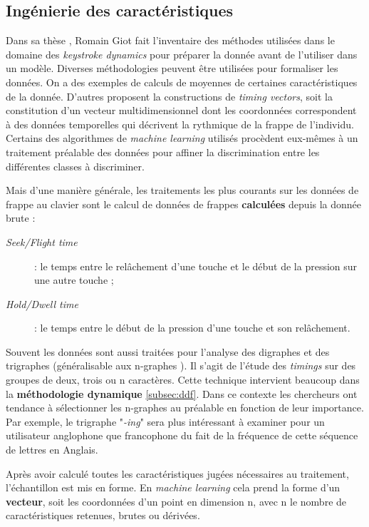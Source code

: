\subsection{Ingénierie des caractéristiques}
\label{subsec:featureengineering}

Dans sa thèse \cite{giotThese}, Romain Giot fait l'inventaire des méthodes utilisées dans le domaine des \textit{keystroke dynamics} pour préparer la donnée avant de l'utiliser dans un modèle. Diverses méthodologies peuvent être utilisées pour formaliser les données. On a des exemples de calculs de moyennes de certaines caractéristiques de la donnée. D'autres proposent la constructions de \textit{timing vectors}\cite{killourhy2009}, soit la constitution d'un vecteur multidimensionnel dont les coordonnées correspondent à des données temporelles qui décrivent la rythmique de la frappe de l'individu.\\

Certains des algorithmes de \textit{machine learning} utilisés procèdent eux-mêmes à un traitement préalable des données pour affiner la discrimination entre les différentes classes à discriminer.

Mais d'une manière générale, les traitements les plus courants sur les données de frappe au clavier sont le calcul de données de frappes \textbf{calculées} depuis la donnée brute :

\begin{description}
	\item[\textit{Seek/Flight time}] : le temps entre le relâchement d'une touche et le début de la pression sur une autre touche ;
	\item[\textit{Hold/Dwell time}] : le temps entre le début de la pression d'une touche et son relâchement. \cite{kobojekRNN}
\end{description}

Souvent les données sont aussi traitées pour l'analyse des digraphes et des trigraphes (généralisable aux n-graphes \cite{Hu2008}). Il s'agit de l'étude des \textit{timings} sur des groupes de deux, trois ou n caractères. Cette technique intervient beaucoup dans la \textbf{méthodologie dynamique} \ref{subsec:ddf}. Dans ce contexte les chercheurs ont tendance à sélectionner les n-graphes au préalable en fonction de leur importance. Par exemple, le trigraphe "\textit{-ing}" sera plus intéressant à examiner pour un utilisateur anglophone que francophone du fait de la fréquence de cette séquence de lettres en Anglais.

Après avoir calculé toutes les caractéristiques jugées nécessaires au traitement, l'échantillon est mis en forme. En \textit{machine learning} cela prend la forme d'un \textbf{vecteur}, soit les coordonnées d'un point en dimension n, avec n le nombre de caractéristiques retenues, brutes ou dérivées.